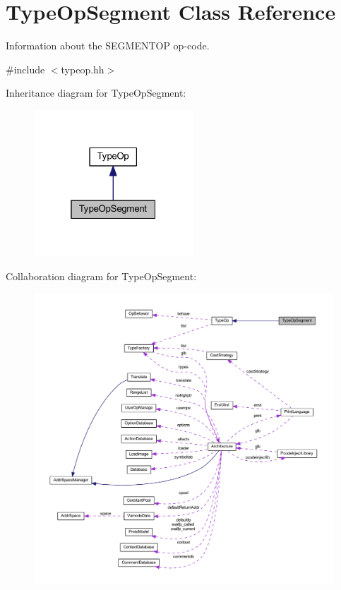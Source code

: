 \hypertarget{class_type_op_segment}{}\section{Type\+Op\+Segment Class Reference}
\label{class_type_op_segment}


Information about the S\+E\+G\+M\+E\+N\+T\+OP op-\/code.  




{\ttfamily \#include $<$typeop.\+hh$>$}



Inheritance diagram for Type\+Op\+Segment\+:
\nopagebreak
\begin{figure}[H]
\begin{center}
\leavevmode
\includegraphics[width=169pt]{class_type_op_segment__inherit__graph}
\end{center}
\end{figure}


Collaboration diagram for Type\+Op\+Segment\+:
\nopagebreak
\begin{figure}[H]
\begin{center}
\leavevmode
\includegraphics[width=350pt]{class_type_op_segment__coll__graph}
\end{center}
\end{figure}
